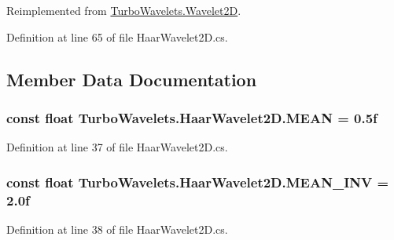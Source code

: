 \-Reimplemented from \hyperlink{class_turbo_wavelets_1_1_wavelet2_d_af0339475762d327f9d8ec019079cdc28}{\-Turbo\-Wavelets.\-Wavelet2\-D}.



\-Definition at line 65 of file \-Haar\-Wavelet2\-D.\-cs.



\subsection{\-Member \-Data \-Documentation}
\hypertarget{class_turbo_wavelets_1_1_haar_wavelet2_d_af0a09712e36a5e8abcaf67e9352c7529}{
\subsubsection[{\-M\-E\-A\-N}]{\setlength{\rightskip}{0pt plus 5cm}const float {\bf \-Turbo\-Wavelets.\-Haar\-Wavelet2\-D.\-M\-E\-A\-N} = 0.\-5f}}\label{class_turbo_wavelets_1_1_haar_wavelet2_d_af0a09712e36a5e8abcaf67e9352c7529}


\-Definition at line 37 of file \-Haar\-Wavelet2\-D.\-cs.

\hypertarget{class_turbo_wavelets_1_1_haar_wavelet2_d_aca358f40b15421e2ad216236fa000cce}{
\subsubsection[{\-M\-E\-A\-N\-\_\-\-I\-N\-V}]{\setlength{\rightskip}{0pt plus 5cm}const float {\bf \-Turbo\-Wavelets.\-Haar\-Wavelet2\-D.\-M\-E\-A\-N\-\_\-\-I\-N\-V} = 2.\-0f}}\label{class_turbo_wavelets_1_1_haar_wavelet2_d_aca358f40b15421e2ad216236fa000cce}


\-Definition at line 38 of file \-Haar\-Wavelet2\-D.\-cs.

